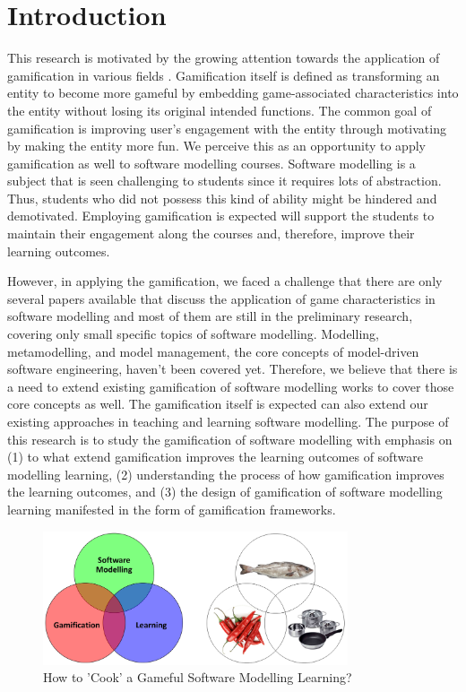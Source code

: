 \documentclass[12pt, a4paper]{report}
\begin{document}
\tableofcontents
{}

\chapter{Introduction}
This research is motivated by the growing attention towards the application of gamification in various fields \cite{kolovos2015eugenia}. Gamification itself is defined as transforming an entity to become more gameful by embedding game-associated characteristics into the entity without losing its original intended functions. The common goal of gamification is improving user’s engagement with the entity through motivating by making the entity more fun. We perceive this as an opportunity to apply gamification as well to software modelling courses. Software modelling is a subject that is seen challenging to students since it requires lots of abstraction. Thus, students who did not possess this kind of ability might be hindered and demotivated. Employing gamification is expected will support the students to maintain their engagement along the courses and, therefore, improve their learning outcomes. 

However, in applying the gamification, we faced a challenge that there are only several papers available that discuss the application of game characteristics in software modelling and most of them are still in the preliminary research, covering only small specific topics of software modelling. Modelling, metamodelling, and model management, the core concepts of model-driven software engineering, haven’t been covered yet.  Therefore, we believe that there is a need to extend existing gamification of software modelling works to cover those core concepts as well. The gamification itself is expected can also extend our existing approaches in teaching and learning software modelling. The purpose of this research is to study the gamification of software modelling with emphasis on (1) to what extend gamification improves the learning outcomes of software modelling learning, (2) understanding the process of how gamification improves the learning outcomes, and (3) the design of gamification of software modelling learning manifested in the form of gamification frameworks.

\begin{figure}[ht]
\centering
\includegraphics[width=9cm]{smlg}
\caption{How to 'Cook' a Gameful Software Modelling Learning?}
\label{fig:smlg}
\end{figure}
\end{document}
